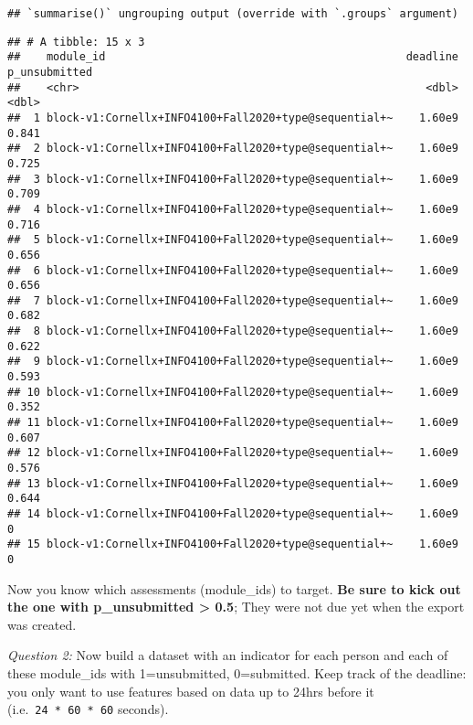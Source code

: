 \documentclass[
]{article}
\begin{document}
\begin{verbatim}
## `summarise()` ungrouping output (override with `.groups` argument)
\end{verbatim}

\begin{verbatim}
## # A tibble: 15 x 3
##    module_id                                              deadline p_unsubmitted
##    <chr>                                                     <dbl>         <dbl>
##  1 block-v1:Cornellx+INFO4100+Fall2020+type@sequential+~    1.60e9         0.841
##  2 block-v1:Cornellx+INFO4100+Fall2020+type@sequential+~    1.60e9         0.725
##  3 block-v1:Cornellx+INFO4100+Fall2020+type@sequential+~    1.60e9         0.709
##  4 block-v1:Cornellx+INFO4100+Fall2020+type@sequential+~    1.60e9         0.716
##  5 block-v1:Cornellx+INFO4100+Fall2020+type@sequential+~    1.60e9         0.656
##  6 block-v1:Cornellx+INFO4100+Fall2020+type@sequential+~    1.60e9         0.656
##  7 block-v1:Cornellx+INFO4100+Fall2020+type@sequential+~    1.60e9         0.682
##  8 block-v1:Cornellx+INFO4100+Fall2020+type@sequential+~    1.60e9         0.622
##  9 block-v1:Cornellx+INFO4100+Fall2020+type@sequential+~    1.60e9         0.593
## 10 block-v1:Cornellx+INFO4100+Fall2020+type@sequential+~    1.60e9         0.352
## 11 block-v1:Cornellx+INFO4100+Fall2020+type@sequential+~    1.60e9         0.607
## 12 block-v1:Cornellx+INFO4100+Fall2020+type@sequential+~    1.60e9         0.576
## 13 block-v1:Cornellx+INFO4100+Fall2020+type@sequential+~    1.60e9         0.644
## 14 block-v1:Cornellx+INFO4100+Fall2020+type@sequential+~    1.60e9         0    
## 15 block-v1:Cornellx+INFO4100+Fall2020+type@sequential+~    1.60e9         0
\end{verbatim}

Now you know which assessments (module\_ids) to target. \textbf{Be sure
to kick out the one with p\_unsubmitted \textgreater{} 0.5}; They were
not due yet when the export was created.

\emph{Question 2:} Now build a dataset with an indicator for each person
and each of these module\_ids with 1=unsubmitted, 0=submitted. Keep
track of the deadline: you only want to use features based on data up to
24hrs before it (i.e.~\texttt{24\ *\ 60\ *\ 60} seconds).
\end{document}
